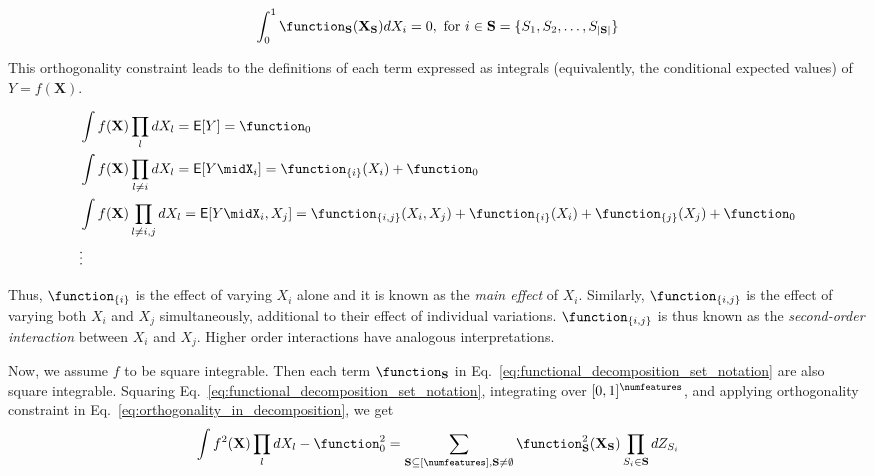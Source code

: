 \iffalse
\begin{align}
	\label{eq:orthogonality_in_decomposition}
	\int_{0}^{1} \function_{\mathbf{S}}(\mathbf{X}_{\mathbf{S}})dX_i = 0, \text{ for } i \in \mathbf{S} = \{S_1, S_2, \dots, S_{|\mathbf{S}|}\}
\end{align}

This orthogonality constraint leads to the definitions of each term expressed as integrals (equivalently, the conditional expected values) of $ Y = f(\mathbf{X}) $. 

\begin{align*}
	&\int f(\mathbf{X})\prod_l dX_l =  \mathsf{E}[Y] = \function_0\\
	&\int f(\mathbf{X})\prod_{l \ne i} dX_l =  \mathsf{E}[Y\midX_i] = \function_{\{i\}}(X_i) + \function_0\\
	&\int f(\mathbf{X})\prod_{l \ne i, j} dX_l = \mathsf{E}[Y\midX_i, X_j] = \function_{\{i,j\}}(X_i, X_j)  +  \function_{\{i\}}(X_i) +  \function_{\{j\}}(X_j) + \function_0 \\
	&\vdots
\end{align*}

Thus, $ \function_{\{i\}} $ is the effect of varying $ X_i $ alone and it is known as the \emph{main effect} of $ X_i $. Similarly, $ \function_{\{i,j\}} $ is the effect of varying both $ X_i $ and $ X_j $ simultaneously, additional to their effect of individual variations. $ \function_{\{i,j\}} $ is thus known as the \emph{second-order interaction} between $ X_i $ and $ X_j $. Higher order interactions have analogous interpretations. 

Now, we assume $ f $ to be square integrable. Then each term $ \function_{\mathbf{S}} $ in Eq.~\eqref{eq:functional_decomposition_set_notation} are also square integrable. Squaring Eq.~\eqref{eq:functional_decomposition_set_notation}, integrating over $  [0,1]^\numfeatures$, and applying orthogonality constraint in Eq.~\ref{eq:orthogonality_in_decomposition}, we get
\begin{align*}
	\int f^2(\mathbf{X})\prod_l dX_l - \function_0^2 = \sum_{\mathbf{S} \subseteq [\numfeatures], \mathbf{S}\ne \emptyset}  \function_{\mathbf{S}}^2(\mathbf{X}_{\mathbf{S}}) \prod_{S_i \in \mathbf{S}} d Z_{S_i}
\end{align*}

